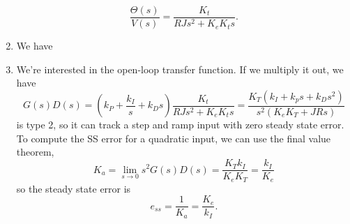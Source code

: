 \documentclass{article}
\numberwithin{equation}{section}
\begin{document}
\begin{enumerate}
    \begin{equation}
        \frac{\Theta(s)}{V(s)} = \frac{K_t}{RJs^2+K_eK_ts}.
    \end{equation}
    \item We have 
    \begin{center}
    \end{center}
    \item We're interested in the open-loop transfer function. If we multiply it out, we have 
    \begin{equation}
        G(s)D(s) = \left(k_P + \frac{k_I}{s} + k_Ds\right)\frac{K_t}{RJs^2+K_eK_ts} = \frac{K_T(k_I+k_ps+k_Ds^2)}{s^2(K_eK_T+JRs)}
    \end{equation}
    is type 2, so it can track a step and ramp input with zero steady state error. To compute the SS error for a quadratic input, we can use the final value theorem, 
    \begin{equation}
        K_a = \lim_{s\to 0} s^2 G(s)D(s) = \frac{K_Tk_I}{K_eK_T} = \frac{k_I}{K_e}
    \end{equation}
    so the steady state error is 
    \begin{equation}
        e_{ss} = \frac{1}{K_a} = \frac{K_e}{k_I}.
    \end{equation}
\end{enumerate}
\end{document}
